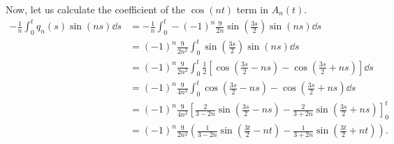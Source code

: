 \documentclass[plain]{pset}
\begin{document}
\begin{solution}
    Now, let us calculate the coefficient of the \(\cos(nt)\) term in \(A_n(t)\).
    \begin{align*}
        -\frac{1}{n}\int_0^t q_n(s)\sin(ns) \dd{s} & = -\frac{1}{n}\int_0^t -(-1)^n\frac{9}{2n}\sin\left(\frac{3s}{2}\right)\sin(ns) \dd{s}                                                         \\
                                                   & = (-1)^n\frac{9}{2n^2}\int_0^t \sin\left(\frac{3s}{2}\right)\sin(ns) \dd{s}                                                                    \\
                                                   & = (-1)^n\frac{9}{2n^2}\int_0^t \frac{1}{2}\left[\cos\left(\frac{3s}{2} - ns\right) - \cos\left(\frac{3s}{2} + ns\right)\right] \dd{s}          \\
                                                   & = (-1)^n\frac{9}{4n^2}\int_0^t \cos\left(\frac{3s}{2} - ns\right) - \cos\left(\frac{3s}{2} + ns\right) \dd{s}                                  \\
                                                   & = (-1)^n\frac{9}{4n^2}\left[\frac{2}{3 - 2n}\sin\left(\frac{3s}{2} - ns\right) - \frac{2}{3 + 2n}\sin\left(\frac{3s}{2} + ns\right)\right]_0^t \\
                                                   & = (-1)^n\frac{9}{2n^2}\left(\frac{1}{3 - 2n}\sin\left(\frac{3t}{2} - nt\right) - \frac{1}{3 + 2n}\sin\left(\frac{3t}{2} + nt\right)\right).
    \end{align*}


\end{solution}
\end{document}
